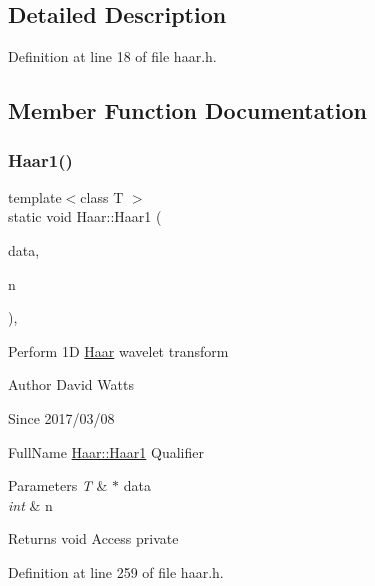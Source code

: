 \subsection{Detailed Description}


Definition at line 18 of file haar.\+h.



\subsection{Member Function Documentation}
\mbox{\label{class_haar_a44ab3d3043f2a9c2145629a242e6ed0f}} 
\subsubsection{\texorpdfstring{Haar1()}{Haar1()}}
{\footnotesize\ttfamily template$<$class T $>$ \\
static void Haar\+::\+Haar1 (\begin{DoxyParamCaption}\item[{T $\ast$}]{data,  }\item[{int}]{n }\end{DoxyParamCaption})\hspace{0.3cm}{\ttfamily [inline]}, {\ttfamily [static]}}

Perform 1D \hyperlink{class_haar}{Haar} wavelet transform

\begin{DoxyAuthor}{Author}
David Watts 
\end{DoxyAuthor}
\begin{DoxySince}{Since}
2017/03/08
\end{DoxySince}
Full\+Name \hyperlink{class_haar_a44ab3d3043f2a9c2145629a242e6ed0f}{Haar\+::\+Haar1} Qualifier 
\begin{DoxyParams}{Parameters}
{\em T} & $\ast$ data \\
\hline
{\em int} & n \\
\hline
\end{DoxyParams}
\begin{DoxyReturn}{Returns}
void Access private 
\end{DoxyReturn}


Definition at line 259 of file haar.\+h.

